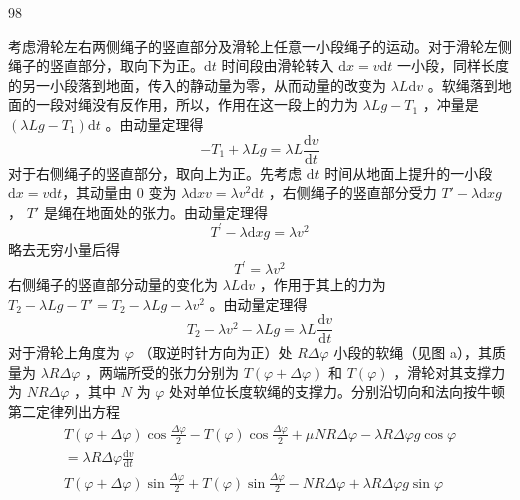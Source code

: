 \begin{solution}{98}
    \begin{subsolution}
        考虑滑轮左右两侧绳子的竖直部分及滑轮上任意一小段绳子的运动。对于滑轮左侧绳子的竖直部分，取向下为正。$\mathrm{d}t$ 时间段由滑轮转入 $\mathrm{d}x=v\mathrm{d}t$ 一小段，同样长度的另一小段落到地面，传入的静动量为零，从而动量的改变为 $\lambda L\mathrm{d}v$ 。软绳落到地面的一段对绳没有反作用，所以，作用在这一段上的力为 $\lambda Lg-T_{1}$ ，冲量是 $(\lambda Lg-T_{1})\mathrm{d}t$ 。由动量定理得
        \begin{equation}
            - T _ {1} + \lambda L g = \lambda L \frac {\mathrm{d} v}{\mathrm{d} t}
            \label{eq:1.p98}
        \end{equation}
        对于右侧绳子的竖直部分，取向上为正。先考虑 $\mathrm{d}t$ 时间从地面上提升的一小段 $\mathrm{d}x = v \mathrm{d}t$，其动量由 0 变为 $\lambda \mathrm{d}x v = \lambda v^{2}\mathrm{d}t$ ，右侧绳子的竖直部分受力 $T' - \lambda \mathrm{d}x g$ ， $T'$ 是绳在地面处的张力。由动量定理得
        \begin{equation*}
            T ^ {\prime} - \lambda \mathrm{d} x g = \lambda v ^ {2}
        \end{equation*}
        略去无穷小量后得
        \begin{equation*}
            T ^ {\prime} = \lambda v ^ {2}
        \end{equation*}
        右侧绳子的竖直部分动量的变化为 $\lambda L \mathrm{d}v$ ，作用于其上的力为 $T_{2}-\lambda L g-T'=T_{2}-\lambda L g-\lambda v^{2}$ 。由动量定理得
        \begin{equation}
            T _ {2} - \lambda v ^ {2} - \lambda L g = \lambda L \frac {\mathrm{d} v}{\mathrm{d} t}
            \label{eq:2.p98}
        \end{equation}
        对于滑轮上角度为 $\varphi$ （取逆时针方向为正）处 $R\Delta\varphi$ 小段的软绳（见图 a），其质量为 $\lambda R\Delta\varphi$ ，两端所受的张力分别为 $T(\varphi + \Delta\varphi)$ 和 $T(\varphi)$ ，滑轮对其支撑力为 $N R\Delta\varphi$ ，其中 $N$ 为 $\varphi$ 处对单位长度软绳的支撑力。分别沿切向和法向按牛顿第二定律列出方程
        \begin{align*}
            T (\varphi + \Delta \varphi) \cos \frac {\Delta \varphi}{2} - T (\varphi) \cos \frac {\Delta \varphi}{2} + \mu N R \Delta \varphi - \lambda R \Delta \varphi g \cos \varphi \\
            = \lambda R \Delta \varphi \frac {\mathrm{d} v}{\mathrm{d} t} \\
            T (\varphi + \Delta \varphi) \sin \frac {\Delta \varphi}{2} + T (\varphi) \sin \frac {\Delta \varphi}{2} - N R \Delta \varphi + \lambda R \Delta \varphi g \sin \varphi \\

\end{align*}
\end{subsolution}
\end{solution}
